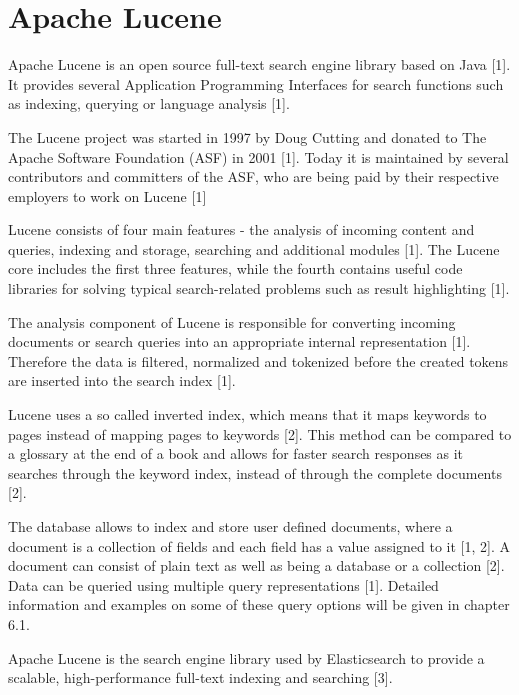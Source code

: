 \chapter{Apache Lucene}

Apache Lucene is an open source full-text search engine library based on Java [1]. It provides several Application Programming Interfaces for search functions such as indexing, querying or language analysis [1].

The Lucene project was started in 1997 by Doug Cutting and donated to The Apache Software Foundation (ASF) in 2001 [1]. Today it is maintained by several contributors and committers of the ASF, who are being paid by their respective employers to work on Lucene [1]

Lucene consists of four main features - the analysis of incoming content and queries, indexing and storage, searching and additional modules [1]. The Lucene core includes the first three features, while the fourth contains useful code libraries for solving typical search-related problems such as result highlighting [1].

The analysis component of Lucene is responsible for converting incoming documents or search queries into an appropriate internal representation [1]. Therefore the data is filtered, normalized and tokenized before the created tokens are inserted into the search index [1].

Lucene uses a so called inverted index, which means that it maps keywords to pages instead of mapping pages to keywords [2]. This method can be compared to a glossary at the end of a book and allows for faster search responses as it searches through the keyword index, instead of through the complete documents [2].

The database allows to index and store user defined documents, where a document is a collection of fields and each field has a value assigned to it [1, 2]. A document can consist of plain text as well as being a database or a collection [2]. 
Data can be queried using multiple query representations [1]. Detailed information and examples on some of these query options will be given in chapter 6.1.

Apache Lucene is the search engine library used by Elasticsearch to provide a scalable, high-performance full-text indexing and searching [3].
